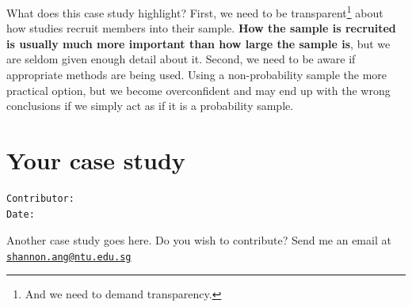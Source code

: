 \documentclass[openany]{book}
\let\rmarkdownfootnote\footnote%
\def\footnote{\protect\rmarkdownfootnote}
\begin{document}
What does this case study highlight? First, we need to be
transparent\footnote{And we need to demand transparency.} about how
studies recruit members into their sample. \textbf{How the sample is
recruited is usually much more important than how large the sample is},
but we are seldom given enough detail about it. Second, we need to be
aware if appropriate methods are being used. Using a non-probability
sample the more practical option, but we become overconfident and may
end up with the wrong conclusions if we simply act as if it is a
probability sample.

\chapter{Your case study}\label{case3}

\begin{verbatim}
Contributor: 
Date: 
\end{verbatim}

Another case study goes here. Do you wish to contribute? Send me an
email at
\href{mailto:shannon.ang@ntu.edu.sg}{\nolinkurl{shannon.ang@ntu.edu.sg}}


\end{document}
